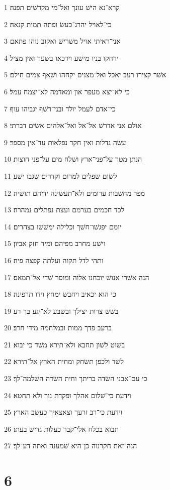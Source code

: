 \par 1 קרא־נא הישׁ עונך ואל־מי מקדשׁים תפנה׃
\par 2 כי־לאויל יהרג־כעשׂ ופתה תמית קנאה׃
\par 3 אני־ראיתי אויל משׁרישׁ ואקוב נוהו פתאם׃
\par 4 ירחקו בניו מישׁע וידכאו בשׁער ואין מציל׃
\par 5 אשׁר קצירו רעב יאכל ואל־מצנים יקחהו ושׁאף צמים חילם׃
\par 6 כי לא־יצא מעפר און ומאדמה לא־יצמח עמל׃
\par 7 כי־אדם לעמל יולד ובני־רשׁף יגביהו עוף׃
\par 8 אולם אני אדרשׁ אל־אל ואל־אלהים אשׂים דברתי׃
\par 9 עשׂה גדלות ואין חקר נפלאות עד־אין מספר׃
\par 10 הנתן מטר על־פני־ארץ ושׁלח מים על־פני חוצות׃
\par 11 לשׂום שׁפלים למרום וקדרים שׂגבו ישׁע׃
\par 12 מפר מחשׁבות ערומים ולא־תעשׂינה ידיהם תושׁיה׃
\par 13 לכד חכמים בערמם ועצת נפתלים נמהרה׃
\par 14 יומם יפגשׁו־חשׁך וכלילה ימשׁשׁו בצהרים׃
\par 15 וישׁע מחרב מפיהם ומיד חזק אביון׃
\par 16 ותהי לדל תקוה ועלתה קפצה פיה׃
\par 17 הנה אשׁרי אנושׁ יוכחנו אלוה ומוסר שׁדי אל־תמאס׃
\par 18 כי הוא יכאיב ויחבשׁ ימחץ וידו תרפינה׃
\par 19 בשׁשׁ צרות יצילך ובשׁבע לא־יגע בך רע׃
\par 20 ברעב פדך ממות ובמלחמה מידי חרב׃
\par 21 בשׁוט לשׁון תחבא ולא־תירא משׁד כי יבוא׃
\par 22 לשׁד ולכפן תשׂחק ומחית הארץ אל־תירא׃
\par 23 כי עם־אבני השׂדה בריתך וחית השׂדה השׁלמה־לך׃
\par 24 וידעת כי־שׁלום אהלך ופקדת נוך ולא תחטא׃
\par 25 וידעת כי־רב זרעך וצאצאיך כעשׂב הארץ׃
\par 26 תבוא בכלח אלי־קבר כעלות גדישׁ בעתו׃
\par 27 הנה־זאת חקרנוה כן־היא שׁמענה ואתה דע־לך׃

\chapter{6}

